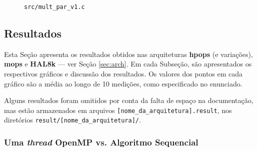 \documentclass[a4paper, 12pt]{article}
\begin{document}
\begin{figure}[H]
    \centering
    
    \caption{\texttt{src/mult\_par\_v1.c}}
    \label{fig:par_v1}
\end{figure}

\subsection{Resultados} \label{sec:res}

Esta Seção apresenta os resultados obtidos nas arquiteturas \textbf{hpops}
(e variações), \textbf{mops} e \textbf{HAL8k} --- ver Seção \ref{sec:arch}.
Em cada Subseção, são apresentados os respectivos gráficos e discussão dos
resultados. Os valores dos pontos em cada gráfico são a média ao longo de
10 medições, como especificado no enunciado.

Alguns resultados foram omitidos por conta da falta de espaço na
documentação, mas estão armazenados em arquivos
\texttt{[nome\_da\_arquitetura].result}, nos diretórios
\texttt{result/[nome\_da\_arquitetura]/}.

\subsubsection{Uma \textit{thread} OpenMP vs. Algoritmo Sequencial}
\end{document}
